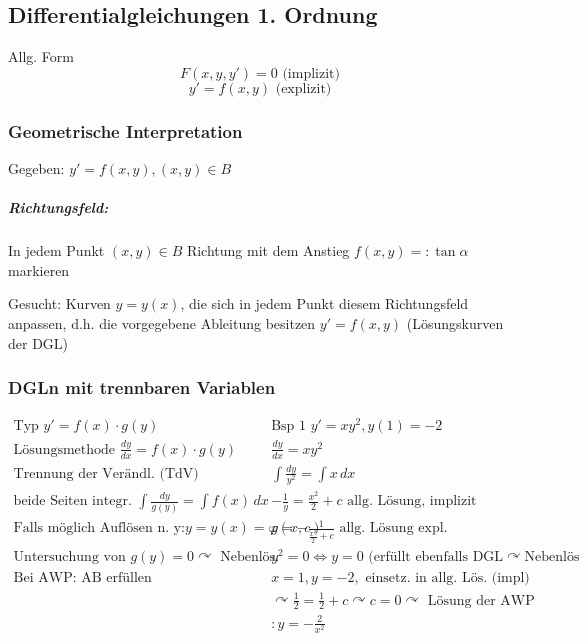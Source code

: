 \documentclass[a4paper]{scrartcl}
\begin{document}
\subsection{Differentialgleichungen 1. Ordnung}
Allg. Form 
\[ F(x,y,y') = 0 \text{ (implizit)} \]
\[ y' = f(x,y) \text{ (explizit)} \]

\subsubsection{Geometrische Interpretation}
Gegeben: $y'=f(x,y), (x,y) \in B$

\subparagraph{Richtungsfeld:} In jedem Punkt $(x,y) \in B$ Richtung mit dem Anstieg $f(x,y)=: \tan{\alpha}$ markieren

Gesucht: Kurven $y=y(x)$, die sich in jedem Punkt diesem Richtungsfeld anpassen, d.h. die vorgegebene Ableitung besitzen $y' = f(x,y)$ (Lösungskurven der DGL)

\subsubsection{DGLn mit trennbaren Variablen}
\[ \begin{array}{l|l}
\text{Typ } y' = f(x) \cdot g(y) & \text{Bsp 1 } y'=xy^2, y(1) =-2\\ \hline 
\text{Lösungsmethode } \frac{dy}{dx} = f(x) \cdot g(y) & \frac{dy}{dx} = xy^2\\ \hline
\text{Trennung der Verändl. (TdV)} & \int \frac{dy}{y^2} = \int x \, dx\\
\text{beide Seiten integr. } \int \frac{dy}{g(y)} = \int f(x) \, dx & - \frac{1}{y} = \frac{x^2}{2} + c \text{ allg. Lösung, implizit} \\ \hline
\text{Falls möglich Auflösen n. y:} y=y(x) = \varphi (x,c) & y= - \frac{1}{\frac{x^2}{2} +c} \text{ allg. Lösung expl.} \\ \hline
\text{Untersuchung von } g(y) = 0 \curvearrowright \text{ Nebenlös.} & y^2 = 0 \Leftrightarrow y=0 \text{ (erfüllt ebenfalls DGL} \curvearrowright \text{Nebenlös} \\ \hline
\text{Bei AWP: AB erfüllen} & x=1,y=-2, \text{ einsetz. in allg. Lös. (impl)} \\ &\curvearrowright \frac{1}{2} = \frac{1}{2} + c \curvearrowright c = 0 \curvearrowright
\text{ Lösung der AWP } \\ & : y= -\frac{2}{x^2}\\
\end{array} \]
\end{document}
